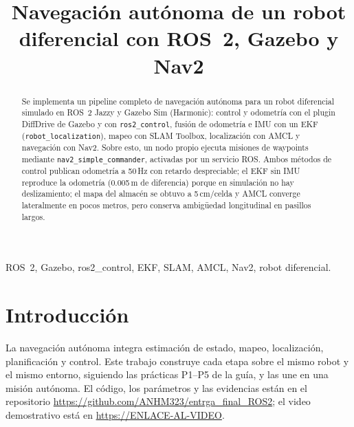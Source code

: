 \documentclass[conference,a4paper]{IEEEtran}
\newcommand{\repo}{\url{https://github.com/ANHM323/entrga_final_ROS2}}
\newcommand{\video}{\url{https://ENLACE-AL-VIDEO}}
\begin{document}
\title{Navegación autónoma de un robot diferencial con ROS~2, Gazebo y Nav2}

\author{
}

\maketitle

\begin{abstract}
Se implementa un pipeline completo de navegación autónoma para un robot diferencial simulado en ROS~2 Jazzy y Gazebo Sim (Harmonic): control y odometría con el plugin DiffDrive de Gazebo y con \texttt{ros2\_control}, fusión de odometría e IMU con un EKF (\texttt{robot\_localization}), mapeo con SLAM Toolbox, localización con AMCL y navegación con Nav2. Sobre esto, un nodo propio ejecuta misiones de waypoints mediante \texttt{nav2\_simple\_commander}, activadas por un servicio ROS. Ambos métodos de control publican odometría a 50\,Hz con retardo despreciable; el EKF sin IMU reproduce la odometría (0.005\,m de diferencia) porque en simulación no hay deslizamiento; el mapa del almacén se obtuvo a 5\,cm/celda y AMCL converge lateralmente en pocos metros, pero conserva ambigüedad longitudinal en pasillos largos.
\end{abstract}

\begin{IEEEkeywords}
ROS~2, Gazebo, ros2\_control, EKF, SLAM, AMCL, Nav2, robot diferencial.
\end{IEEEkeywords}

\section{Introducción}
La navegación autónoma integra estimación de estado, mapeo, localización, planificación y control. Este trabajo construye cada etapa sobre el mismo robot y el mismo entorno, siguiendo las prácticas P1--P5 de la guía, y las une en una misión autónoma. El código, los parámetros y las evidencias están en el repositorio \repo; el video demostrativo está en \video.

\end{document}
